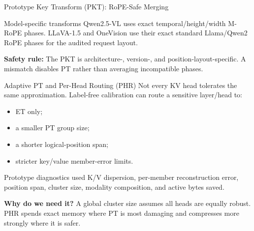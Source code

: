 \documentclass[aspectratio=169,10pt]{beamer}
\newcommand{\whylabel}{\textbf{Why do we need it?}}
\newcommand{\safetylabel}{\textbf{Safety rule:}}
\newcommand{\tightitems}{\setlength{\itemsep}{0.28em}\setlength{\parskip}{0pt}}
\begin{document}
\begin{frame}{Prototype Key Transform (PKT): RoPE-Safe Merging}
\scriptsize
\begin{center}
\end{center}
\begin{block}{Model-specific transforms}
Qwen2.5-VL uses exact temporal/height/width M-RoPE phases. LLaVA-1.5 and OneVision use their exact
standard Llama/Qwen2 RoPE phases for the audited request layout.
\end{block}
\begin{alertblock}{\safetylabel}
The PKT is architecture-, version-, and position-layout-specific. A mismatch disables PT rather
than averaging incompatible phases.
\end{alertblock}
\end{frame}

\begin{frame}{Adaptive PT and Per-Head Routing (PHR)}
\small
Not every KV head tolerates the same approximation. Label-free calibration can route a sensitive
layer/head to:
\begin{itemize}\tightitems
  \item ET only;
  \item a smaller PT group size;
  \item a shorter logical-position span;
  \item stricter key/value member-error limits.
\end{itemize}
\begin{block}{Prototype diagnostics used}
K/V dispersion, per-member reconstruction error, position span, cluster size, modality
composition, and active bytes saved.
\end{block}
\begin{alertblock}{\whylabel}
A global cluster size assumes all heads are equally robust. PHR spends exact memory where PT is
most damaging and compresses more strongly where it is safer.
\end{alertblock}
\end{frame}
\end{document}
